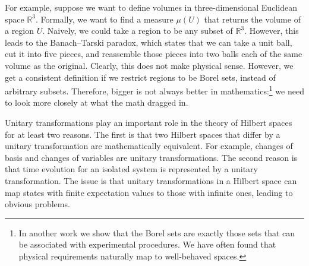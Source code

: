 \documentclass[10pt,twocolumn, nofootinbib]{revtex4-2}
\begin{document}
For example, suppose we want to define volumes in three-dimensional Euclidean space $\mathbb{R}^3$. Formally, we want to find a measure $\mu(U)$ that returns the volume of a region $U$. Naively, we could take a region to be any subset of $\mathbb{R}^3$. However, this leads to the Banach–Tarski paradox,\cite{tao2021introduction} which states that we can take a unit ball, cut it into five pieces, and reassemble those pieces into two balls each of the same volume as the original. Clearly, this does not make physical sense. However, we get a consistent definition if we restrict regions to be Borel sets, instead of arbitrary subsets. Therefore, bigger is not always better in mathematics:\footnote{In another work\cite{AoPBook} we show that the Borel sets are exactly those sets that can be associated with experimental procedures. We have often found that physical requirements naturally map to well-behaved spaces.} we need to look more closely at what the math dragged in.

Unitary transformations play an important role in the theory of Hilbert spaces for at least two reasons. The first is that two Hilbert spaces that differ by a unitary transformation are mathematically equivalent. For example, changes of basis and changes of variables are unitary transformations. The second reason is that time evolution for an isolated system is represented by a unitary transformation. The issue is that unitary transformations in a Hilbert space can map states with finite expectation values to those with infinite ones, leading to obvious problems.
\end{document}
